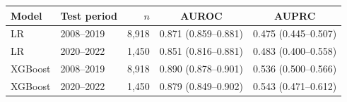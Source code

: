 \begin{tabular}{@{}llrcc@{}}
\toprule
Model & Test period & $n$ & AUROC & AUPRC \\
\midrule
LR & 2008--2019 & 8,918 & 0.871 (0.859--0.881) & 0.475 (0.445--0.507) \\
LR & 2020--2022 & 1,450 & 0.851 (0.816--0.881) & 0.483 (0.400--0.558) \\
XGBoost & 2008--2019 & 8,918 & 0.890 (0.878--0.901) & 0.536 (0.500--0.566) \\
XGBoost & 2020--2022 & 1,450 & 0.879 (0.849--0.902) & 0.543 (0.471--0.612) \\
\bottomrule
\end{tabular}
